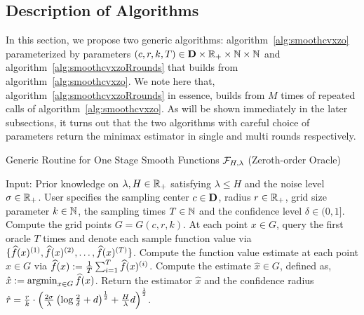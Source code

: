 \subsection{Description of Algorithms}
In this section, we propose two generic algorithms: algorithm~\ref{alg:smoothcvxzo} 
parameterized by parameters $(c,r,k,T)\in \mathbf{D} \times \mathbb{R}_+ \times \mathbb{N} \times \mathbb{N}$ 
and algorithm~\ref{alg:smoothcvxzoRrounds} that builds from algorithm~\ref{alg:smoothcvxzo}.  
We note here that, algorithm~\ref{alg:smoothcvxzoRrounds} in essence, builds 
from $M$ times of repeated calls of algorithm~\ref{alg:smoothcvxzo}.
As will be shown immediately in the later subsections, it turns out that the two algorithms 
with careful choice of parameters return the minimax estimator in single and multi rounds 
respectively.
\begin{algorithm}[htp]
\caption{Generic Routine for One Stage Smooth Functions $\mathcal{F}_{H, \lambda}$ (Zeroth-order Oracle)} 
\begin{algorithmic}[1]  
\Statex Input: Prior knowledge on $\lambda, H \in \mathbb{R}_+$ satisfying $\lambda \leq H$ and 
	the noise level $\sigma \in \mathbb{R}_+$. User specifies the sampling center $c\in \mathbf{D}$, 
	radius $r\in \mathbb{R}_+$, grid size parameter $k\in \mathbb{N}$, the sampling times $T \in \mathbb{N}$ 
	and the confidence level $\delta \in (0, 1]$.
\State Compute the grid points $G = G(c, r, k)$.
\State At each point $x\in G$, query the first oracle $T$ times and denote each 
	sample function value via $\{\widehat{f}(x)^{(1)}, \widehat{f}(x)^{(2)}, \ldots, 
		\widehat{f}(x)^{(T)}\}$.
\State Compute the function value estimate at each point $x \in G$ via 
	$\widehat{f}(x) := \frac{1}{T} \sum_{i=1}^{T} \widehat{f}(x)^{(i)}$.
\State Compute the estimate $\hat{x} \in G$, defined as, 
	$\hat{x} \defeq \argmin_{x\in G} \what{f}(x)$. 
\State Return the estimator $\hat{x}$ and the confidence radius 
	$\hat{r} = \frac{r}{k} \cdot 
		\left(\frac{2\sigma}{\lambda} \left(\log \frac{2}{\delta} + d\right)^{\frac{1}{2}} + \frac{H}{\lambda}d\right)^{\frac{1}{2}}$.
\end{algorithmic}
\label{alg:smoothcvxzo}
\end{algorithm}

